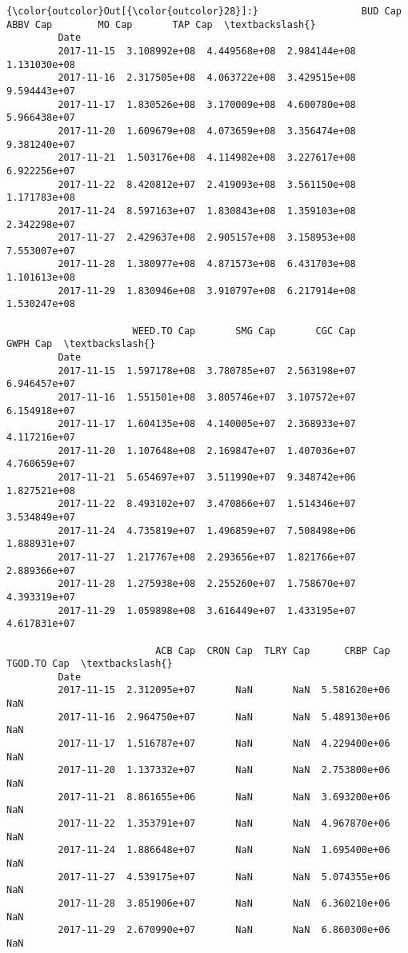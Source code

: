 \documentclass[11pt]{article}
\begin{document}
\begin{Verbatim}[commandchars=\\\{\}]
{\color{outcolor}Out[{\color{outcolor}28}]:}                  BUD Cap      ABBV Cap        MO Cap       TAP Cap  \textbackslash{}
         Date                                                                 
         2017-11-15  3.108992e+08  4.449568e+08  2.984144e+08  1.131030e+08   
         2017-11-16  2.317505e+08  4.063722e+08  3.429515e+08  9.594443e+07   
         2017-11-17  1.830526e+08  3.170009e+08  4.600780e+08  5.966438e+07   
         2017-11-20  1.609679e+08  4.073659e+08  3.356474e+08  9.381240e+07   
         2017-11-21  1.503176e+08  4.114982e+08  3.227617e+08  6.922256e+07   
         2017-11-22  8.420812e+07  2.419093e+08  3.561150e+08  1.171783e+08   
         2017-11-24  8.597163e+07  1.830843e+08  1.359103e+08  2.342298e+07   
         2017-11-27  2.429637e+08  2.905157e+08  3.158953e+08  7.553007e+07   
         2017-11-28  1.380977e+08  4.871573e+08  6.431703e+08  1.101613e+08   
         2017-11-29  1.830946e+08  3.910797e+08  6.217914e+08  1.530247e+08   
         
                      WEED.TO Cap       SMG Cap       CGC Cap      GWPH Cap  \textbackslash{}
         Date                                                                 
         2017-11-15  1.597178e+08  3.780785e+07  2.563198e+07  6.946457e+07   
         2017-11-16  1.551501e+08  3.805746e+07  3.107572e+07  6.154918e+07   
         2017-11-17  1.604135e+08  4.140005e+07  2.368933e+07  4.117216e+07   
         2017-11-20  1.107648e+08  2.169847e+07  1.407036e+07  4.760659e+07   
         2017-11-21  5.654697e+07  3.511990e+07  9.348742e+06  1.827521e+08   
         2017-11-22  8.493102e+07  3.470866e+07  1.514346e+07  3.534849e+07   
         2017-11-24  4.735819e+07  1.496859e+07  7.508498e+06  1.888931e+07   
         2017-11-27  1.217767e+08  2.293656e+07  1.821766e+07  2.889366e+07   
         2017-11-28  1.275938e+08  2.255260e+07  1.758670e+07  4.393319e+07   
         2017-11-29  1.059898e+08  3.616449e+07  1.433195e+07  4.617831e+07   
         
                          ACB Cap  CRON Cap  TLRY Cap      CRBP Cap  TGOD.TO Cap  \textbackslash{}
         Date                                                                      
         2017-11-15  2.312095e+07       NaN       NaN  5.581620e+06          NaN   
         2017-11-16  2.964750e+07       NaN       NaN  5.489130e+06          NaN   
         2017-11-17  1.516787e+07       NaN       NaN  4.229400e+06          NaN   
         2017-11-20  1.137332e+07       NaN       NaN  2.753800e+06          NaN   
         2017-11-21  8.861655e+06       NaN       NaN  3.693200e+06          NaN   
         2017-11-22  1.353791e+07       NaN       NaN  4.967870e+06          NaN   
         2017-11-24  1.886648e+07       NaN       NaN  1.695400e+06          NaN   
         2017-11-27  4.539175e+07       NaN       NaN  5.074355e+06          NaN   
         2017-11-28  3.851906e+07       NaN       NaN  6.360210e+06          NaN   
         2017-11-29  2.670990e+07       NaN       NaN  6.860300e+06          NaN   
         

\end{Verbatim}
\end{document}
